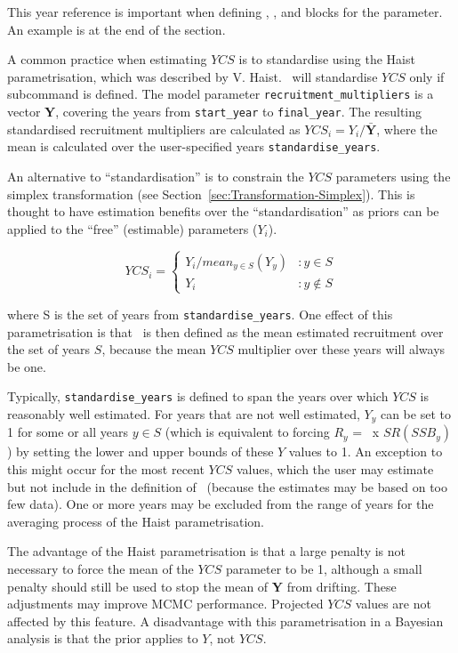 This year reference is important when defining , , and  blocks for the  parameter. An example is at the end of the section.

A common practice when estimating $YCS$ is to standardise using the Haist parametrisation, which was described by V. Haist. \CNAME\ will standardise $YCS$ only if subcommand  is defined. The model parameter \texttt{recruitment\_multipliers} is a vector \textbf{Y}, covering the years from \texttt{start\_year} to \texttt{final\_year}. The resulting standardised recruitment multipliers are calculated as $YCS_i=Y_i/\bar{\textbf{Y}}$, where the mean is calculated over the user-specified years \texttt{standardise\_years}.

An alternative to \enquote{standardisation} is to constrain the $YCS$ parameters using the simplex transformation (see Section~\ref{sec:Transformation-Simplex}). This is thought to have estimation benefits over the \enquote{standardisation} as priors can be applied to the \enquote{free} (estimable) parameters (\(Y_i\)).

\[
YCS_i =
\begin{cases}
Y_i / mean_{y \in S}(Y_y) & :y \in S\\
Y_i					 & :y \notin S
\end{cases}
\]

where S is the set of years from \texttt{standardise\_years}. One effect of this parametrisation is that \Rzero\ is then defined as the mean estimated recruitment over the set of years $S$, because the mean $YCS$ multiplier over these years will always be one.

Typically, \texttt{standardise\_years} is defined to span the years over which $YCS$ is reasonably well estimated. For years that are not well estimated, $Y_y$ can be set to 1 for some or all years $y\in S$ (which is equivalent to forcing $R_y$ = \Rzero\ x $SR(SSB_y)$) by setting the lower and upper bounds of these $Y$ values to 1. An exception to this might occur for the most recent $YCS$ values, which the user may estimate but not include in the definition of \Rzero\ (because the estimates may be based on too few data). One or more years may be excluded from the range of years for the averaging process of the Haist parametrisation.

The advantage of the Haist parametrisation is that a large penalty is not necessary to force the mean of the $YCS$ parameter to be 1, although a small penalty should still be used to stop the mean of \textbf{Y} from drifting. These adjustments may improve MCMC performance. Projected $YCS$ values are not affected by this feature. A disadvantage with this parametrisation in a Bayesian analysis is that the prior applies to $Y$, not $YCS$.

